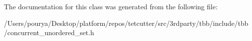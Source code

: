 The documentation for this class was generated from the following file\+:\begin{DoxyCompactItemize}
\item 
/\+Users/pourya/\+Desktop/platform/repos/tetcutter/src/3rdparty/tbb/include/tbb/concurrent\+\_\+unordered\+\_\+set.\+h\end{DoxyCompactItemize}
